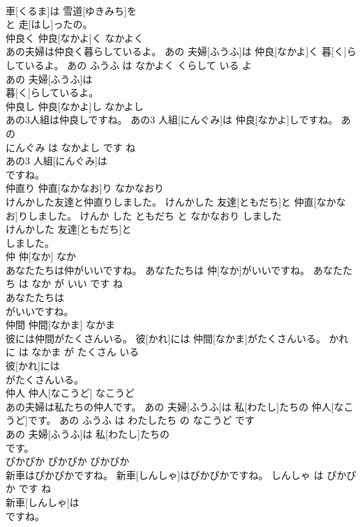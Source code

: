 \documentclass[8pt]{extreport}
\begin{document}
\begin{CJK}{UTF8}{min}
\\	車[くるま]は 雪道[ゆきみち]を
\\	と 走[はし]ったの。			
\\	仲良く	仲良[なかよ]く	なかよく	
\\	あの夫婦は仲良く暮らしているよ。	あの 夫婦[ふうふ]は 仲良[なかよ]く 暮[く]らしているよ。	あの ふうふ は なかよく くらして いる よ	
\\	あの 夫婦[ふうふ]は
\\	暮[く]らしているよ。			
\\	仲良し	仲良[なかよ]し	なかよし	
\\	あの3人組は仲良しですね。	あの3 人組[にんぐみ]は 仲良[なかよ]しですね。	あの 
\\	にんぐみ は なかよし です ね	
\\	あの3 人組[にんぐみ]は
\\	ですね。			
\\	仲直り	仲直[なかなお]り	なかなおり	
\\	けんかした友達と仲直りしました。	けんかした 友達[ともだち]と 仲直[なかなお]りしました。	けんか した ともだち と なかなおり しました	
\\	けんかした 友達[ともだち]と
\\	しました。			
\\	仲	仲[なか]	なか	
\\	あなたたちは仲がいいですね。	あなたたちは 仲[なか]がいいですね。	あなたたち は なか が いい です ね	
\\	あなたたちは
\\	がいいですね。			
\\	仲間	仲間[なかま]	なかま	
\\	彼には仲間がたくさんいる。	彼[かれ]には 仲間[なかま]がたくさんいる。	かれ に は なかま が たくさん いる	
\\	彼[かれ]には
\\	がたくさんいる。			
\\	仲人	仲人[なこうど]	なこうど	
\\	あの夫婦は私たちの仲人です。	あの 夫婦[ふうふ]は 私[わたし]たちの 仲人[なこうど]です。	あの ふうふ は わたしたち の なこうど です	
\\	あの 夫婦[ふうふ]は 私[わたし]たちの
\\	です。			
\\	ぴかぴか	ぴかぴか	ぴかぴか	
\\	新車はぴかぴかですね。	新車[しんしゃ]はぴかぴかですね。	しんしゃ は ぴかぴか です ね	
\\	新車[しんしゃ]は
\\	ですね。			

\end{CJK}
\end{document}
